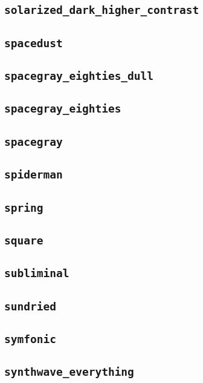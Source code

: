 \subsection{\texttt{solarized\_dark\_higher\_contrast}}
\newpage
\subsection{\texttt{spacedust}}
\newpage
\subsection{\texttt{spacegray\_eighties\_dull}}
\newpage
\subsection{\texttt{spacegray\_eighties}}
\newpage
\subsection{\texttt{spacegray}}
\newpage
\subsection{\texttt{spiderman}}
\newpage
\subsection{\texttt{spring}}
\newpage
\subsection{\texttt{square}}
\newpage
\subsection{\texttt{subliminal}}
\newpage
\subsection{\texttt{sundried}}
\newpage
\subsection{\texttt{symfonic}}
\newpage
\subsection{\texttt{synthwave\_everything}}
\newpage
